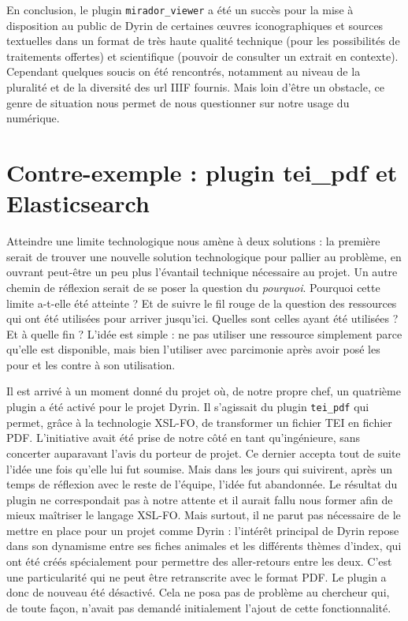 \documentclass[a4paper,12pt,twoside]{book}
\begin{document}
En conclusion, le plugin \texttt{mirador\_viewer} a été un succès pour la mise à disposition au public de Dyrin de certaines \oe{}uvres iconographiques et sources textuelles dans un format de très haute qualité technique (pour les possibilités de traitements offertes) et scientifique (pouvoir de consulter un extrait en contexte). Cependant quelques soucis on été rencontrés, notamment au niveau de la pluralité et de la diversité des url \acrshort{IIIF} fournis. Mais loin d'être un obstacle, ce genre de situation nous permet de nous questionner sur notre usage du numérique.


\section{Contre-exemple : plugin tei\_pdf et Elasticsearch}
Atteindre une limite technologique nous amène à deux solutions : la première serait de trouver une nouvelle solution technologique pour pallier au problème, en ouvrant peut-être un peu plus l'évantail technique nécessaire au projet. Un autre chemin de réflexion serait de se poser la question du \textit{pourquoi}. Pourquoi cette limite a-t-elle été atteinte ?  Et de suivre le fil rouge de la question des ressources qui ont été utilisées pour arriver jusqu'ici. Quelles sont celles ayant été utilisées ? Et à quelle fin ?
L'idée est simple : ne pas utiliser une ressource simplement parce qu'elle est disponible, mais bien l'utiliser avec parcimonie après avoir posé les pour et les contre à son utilisation. 

Il est arrivé à un moment donné du projet où, de notre propre chef, un quatrième plugin a été activé pour le projet Dyrin. Il s'agissait du plugin \texttt{tei\_pdf} qui permet, grâce à la technologie \acrshort{XSL-FO}, de transformer un fichier TEI en fichier PDF. L'initiative avait été prise de notre côté en tant qu'ingénieure, sans concerter auparavant l'avis du porteur de projet. Ce dernier accepta tout de suite l'idée une fois qu'elle lui fut soumise. Mais dans les jours qui suivirent, après un temps de réflexion avec le reste de l'équipe, l'idée fut abandonnée. Le résultat du plugin ne correspondait pas à notre attente et il aurait fallu nous former afin de mieux maîtriser le langage \acrshort{XSL-FO}. Mais surtout, il ne parut pas nécessaire de le mettre en place pour un projet comme Dyrin : l'intérêt principal de Dyrin repose dans son dynamisme entre ses fiches animales et les différents thèmes d'index, qui ont été créés spécialement pour permettre des aller-retours entre les deux. C'est une particularité qui ne peut être retranscrite avec le format PDF. Le plugin a donc de nouveau été désactivé. Cela ne posa pas de problème au chercheur qui, de toute façon, n'avait pas demandé initialement l'ajout de cette fonctionnalité. 
\end{document}
